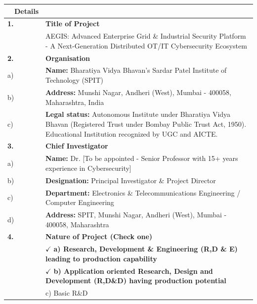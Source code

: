 \documentclass[12pt,a4paper]{article}
\begin{document}
\begin{longtable}{|p{0.5cm}p{3cm}|p{11cm}|}
\hline
\rowcolor{lightblue}
\multicolumn{2}{|c|}{\textbf{Field}} & \textbf{Details} \\
\hline
\endhead

\multicolumn{2}{|l|}{\textbf{1.}} & \textbf{Title of Project} \\
\multicolumn{2}{|l|}{} & AEGIS: Advanced Enterprise Grid \& Industrial Security Platform - A Next-Generation Distributed OT/IT Cybersecurity Ecosystem \\
\hline

\multicolumn{2}{|l|}{\textbf{2.}} & \textbf{Organisation} \\
\multicolumn{2}{|l|}{a)} & \textbf{Name:} Bharatiya Vidya Bhavan's Sardar Patel Institute of Technology (SPIT) \\
\multicolumn{2}{|l|}{b)} & \textbf{Address:} Munshi Nagar, Andheri (West), Mumbai - 400058, Maharashtra, India \\
\multicolumn{2}{|l|}{c)} & \textbf{Legal status:} Autonomous Institute under Bharatiya Vidya Bhavan (Registered Trust under Bombay Public Trust Act, 1950). Educational Institution recognized by UGC and AICTE. \\
\hline

\multicolumn{2}{|l|}{\textbf{3.}} & \textbf{Chief Investigator} \\
\multicolumn{2}{|l|}{a)} & \textbf{Name:} Dr. [To be appointed - Senior Professor with 15+ years experience in Cybersecurity] \\
\multicolumn{2}{|l|}{b)} & \textbf{Designation:} Principal Investigator \& Project Director \\
\multicolumn{2}{|l|}{c)} & \textbf{Department:} Electronics \& Telecommunications Engineering / Computer Engineering \\
\multicolumn{2}{|l|}{d)} & \textbf{Address:} SPIT, Munshi Nagar, Andheri (West), Mumbai - 400058, Maharashtra \\
\hline

\multicolumn{2}{|l|}{\textbf{4.}} & \textbf{Nature of Project (Check one)} \\
\multicolumn{2}{|l|}{} & $\checkmark$ \textbf{a) Research, Development \& Engineering (R,D \& E) leading to production capability} \\
\multicolumn{2}{|l|}{} & $\checkmark$ \textbf{b) Application oriented Research, Design and Development (R,D\&D) having production potential} \\
\multicolumn{2}{|l|}{} & c) Basic R\&D \\
\hline


\end{longtable}
\end{document}
